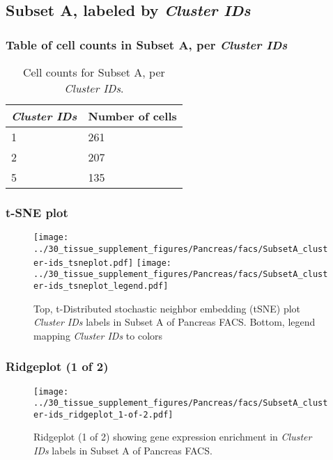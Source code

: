 \clearpage

\subsection{Subset A, labeled by \emph{Cluster IDs}}
\subsubsection{Table of cell counts in Subset A, per \emph{Cluster IDs}}\begin{table}[h]
\centering
\label{my-label}
\begin{tabular}{@{}ll@{}}
\toprule

\emph{Cluster IDs}& Number of cells \\ \midrule
1 & 261 \\

2 & 207 \\

5 & 135 \\
\bottomrule
\end{tabular}
\caption{Cell counts for Subset A, per \emph{Cluster IDs}.}
\end{table}

\clearpage
\subsubsection{t-SNE plot}
\begin{figure}[h]
\centering
\texttt{[image: ../30\_tissue\_supplement\_figures/Pancreas/facs/SubsetA\_cluster-ids\_tsneplot.pdf]}
\texttt{[image: ../30\_tissue\_supplement\_figures/Pancreas/facs/SubsetA\_cluster-ids\_tsneplot\_legend.pdf]}
\caption{Top, t-Distributed stochastic neighbor embedding (tSNE) plot  \emph{Cluster IDs} labels in Subset A of Pancreas FACS. Bottom, legend mapping \emph{Cluster IDs} to colors}
\end{figure}


\clearpage

\subsubsection{Ridgeplot (1 of 2)}
\begin{figure}[h]
\centering
\texttt{[image: ../30\_tissue\_supplement\_figures/Pancreas/facs/SubsetA\_cluster-ids\_ridgeplot\_1-of-2.pdf]}

\caption{ Ridgeplot (1 of 2)  showing gene expression enrichment in \emph{Cluster IDs} labels in Subset A of Pancreas FACS. }
\end{figure}


